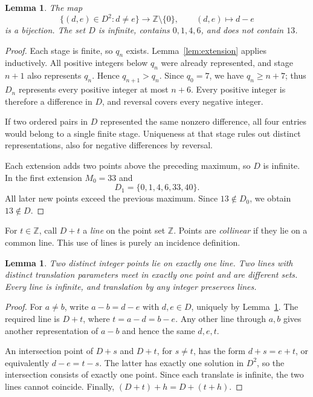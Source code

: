\documentclass[11pt]{article}
\newtheorem{lemma}[theorem]{Lemma}
\theoremstyle{remark}
\newcommand{\Z}{\mathbb Z}
\begin{document}

\begin{lemma}\label{lem:perfect}
The map
\[
 \{(d,e)\in D^2:d\ne e\}\longrightarrow\Z\setminus\{0\},
 \qquad (d,e)\longmapsto d-e
\]
is a bijection. The set $D$ is infinite, contains $0,1,4,6$, and does
not contain $13$.
\end{lemma}

\begin{proof}
Each stage is finite, so $q_n$ exists. Lemma~\ref{lem:extension} applies
inductively. All positive integers below $q_n$ were already represented,
and stage $n+1$ also represents $q_n$. Hence $q_{n+1}>q_n$.
Since $q_0=7$, we have $q_n\ge n+7$; thus $D_n$ represents every
positive integer at most $n+6$. Every positive integer is therefore a
difference in $D$, and reversal covers every negative integer.

If two ordered pairs in $D$ represented the same nonzero difference,
all four entries would belong to a single finite stage. Uniqueness at
that stage rules out distinct representations, also for negative
differences by reversal.

Each extension adds two points above the preceding maximum, so $D$ is
infinite. In the first extension $M_0=33$ and
\[
 D_1=\{0,1,4,6,33,40\}.
\]
All later new points exceed the previous maximum. Since $13\notin D_0$,
we obtain $13\notin D$.
\end{proof}

For $t\in\Z$, call $D+t$ a \emph{line} on the point set $\Z$.
Points are \emph{collinear} if they lie on a common line.
This use of lines is purely an incidence definition.

\begin{lemma}\label{lem:incidence}
Two distinct integer points lie on exactly one line. Two lines with
distinct translation parameters meet in exactly one point and are
different sets. Every line is infinite, and translation by any integer
preserves lines.
\end{lemma}

\begin{proof}
For $a\ne b$, write $a-b=d-e$ with $d,e\in D$, uniquely by
Lemma~\ref{lem:perfect}. The required line is $D+t$, where
$t=a-d=b-e$. Any other line through $a,b$ gives another representation
of $a-b$ and hence the same $d,e,t$.

An intersection point of $D+s$ and $D+t$, for $s\ne t$, has the form
$d+s=e+t$, or equivalently $d-e=t-s$. The latter has exactly one
solution in $D^2$, so the intersection consists of exactly one point.
Since each translate is infinite, the two lines cannot coincide.
Finally, $(D+t)+h=D+(t+h)$.
\end{proof}
\end{document}
